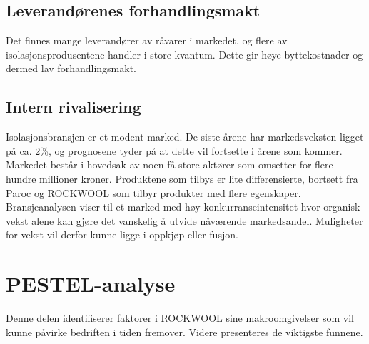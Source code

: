 \subsection{Leverandørenes forhandlingsmakt}
Det finnes mange leverandører av råvarer i markedet, og flere av isolasjonsprodusentene handler i store kvantum. Dette gir høye byttekostnader og dermed lav forhandlingsmakt.

\subsection{Intern rivalisering}
Isolasjonsbransjen er et modent marked. De siste årene har markedsveksten ligget på ca. 2\%, og prognosene tyder på at dette vil fortsette i årene som kommer. Markedet består i hovedsak av noen få store aktører som omsetter for flere hundre millioner kroner. Produktene som tilbys er lite differensierte, bortsett fra Paroc og ROCKWOOL som tilbyr produkter med flere egenskaper. Bransjeanalysen viser til et marked med høy konkurranseintensitet hvor organisk vekst alene kan gjøre det vanskelig å utvide nåværende markedsandel. Muligheter for vekst vil derfor kunne ligge i oppkjøp eller fusjon.

\section{PESTEL-analyse}
Denne delen identifiserer faktorer i ROCKWOOL sine makroomgivelser som vil kunne påvirke bedriften i tiden fremover. Videre presenteres de viktigste funnene.

\begin{table}[ht]
\centering
{}
\caption{Makrofaktorer}
\label{Makrofaktorer}
\end{table}

